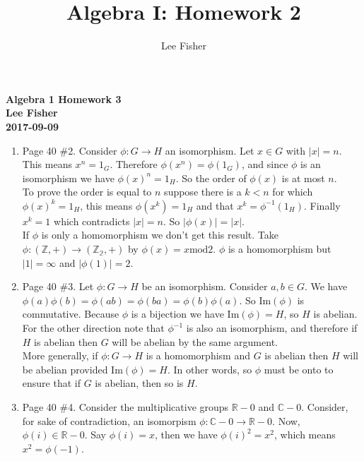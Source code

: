 \documentclass[12pt]{report}
\title{\textbf{Algebra I: Homework 2}}
\author{Lee Fisher}
\date{}
\begin{document}
\textbf{Algebra 1 Homework 3}\\
\indent \textbf{Lee Fisher}\\
\indent \textbf{2017-09-09}

\begin{enumerate}

\item Page 40 \#2. Consider $\phi: G \to H$ an isomorphism. Let $x \in G$ with
      $|x| = n$. This means $x^n=1_G$. Therefore $\phi(x^n) = \phi(1_G)$, and
      since $\phi$ is an isomorphism we have $\phi(x)^n = 1_H$. So the order of
      $\phi(x)$ is at most $n$.\\

      To prove the order is equal to $n$ suppose there is a $k<n$ for which
      $\phi(x)^k = 1_H$, this means $\phi(x^k) = 1_H$ and that $x^k =
      \phi^{-1}(1_H)$. Finally $x^k = 1$ which contradicts $|x|=n$. So
      $|\phi(x)| = |x|$.\\

      If $\phi$ is only a homomorphism we don't get this result. Take
      $\phi:(\mathbb{Z},+) \to (\mathbb{Z_2},+)$ by $\phi(x) = x \textrm{mod}2$.
      $\phi$ is a homomorphism but $|1| = \infty$ and $|\phi(1)| = 2$.\\

\item Page 40 \#3. Let $\phi: G \to H$ be an isomorphism. Consider $a,b \in G$.
      We have $\phi(a)\phi(b) = \phi(ab) = \phi(ba) = \phi(b)\phi(a)$. So
      $\textrm{Im}(\phi)$ is commutative. Because $\phi$ is a bijection we have
      $\textrm{Im}(\phi) = H$, so $H$ is abelian.\\

      For the other direction note that $\phi^{-1}$ is also an isomorphism, and
      therefore if $H$ is abelian then $G$ will be abelian by the same argument.\\

      More generally, if $\phi:G \to H$ is a homomorphism and $G$ is abelian
      then $H$ will be abelian provided $\textrm{Im}(\phi) = H$. In other words,
      so $\phi$ must be onto to ensure that if $G$ is abelian, then so is $H$.\\

\item Page 40 \#4. Consider the multiplicative groups $\mathbb{R}-{0}$ and
      $\mathbb{C}-{0}$. Consider, for sake of contradiction, an isomorpism
      $\phi: \mathbb{C}-{0} \to \mathbb{R}-{0}$. Now, $\phi(i) \in
      \mathbb{R}-{0}$. Say $\phi(i) = x$, then we have $\phi(i)^2 = x^2$, which
      means $x^2 = \phi(-1)$.\\


\end{enumerate}
\end{document}
